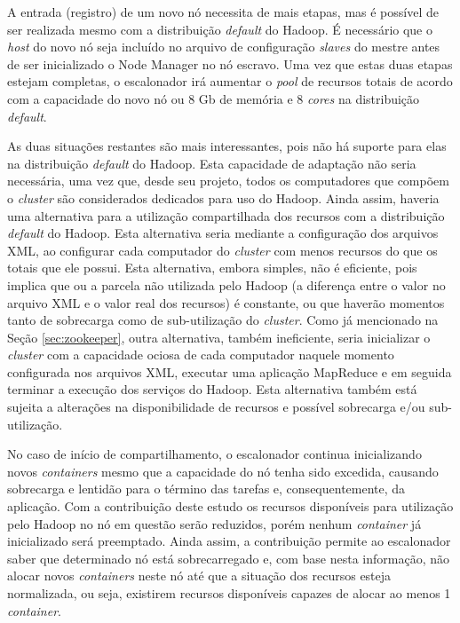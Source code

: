 A entrada (registro) de um novo nó necessita de mais etapas, mas é possível de ser realizada mesmo com a distribuição \textit{default} do Hadoop. É necessário que o \textit{host} do novo nó seja incluído no arquivo de configuração \textit{slaves} do mestre antes de ser inicializado o Node Manager no nó escravo. Uma vez que estas duas etapas estejam completas, o escalonador irá aumentar o \textit{pool} de recursos totais de acordo com a capacidade do novo nó ou 8 Gb de memória e 8 \textit{cores} na distribuição \textit{default}.

As duas situações restantes são mais interessantes, pois não há suporte para elas na distribuição \textit{default} do Hadoop. Esta capacidade de adaptação não seria necessária, uma vez que, desde seu projeto, todos os computadores que compõem o \textit{cluster} são considerados dedicados para uso do Hadoop. Ainda assim, haveria uma alternativa para a utilização compartilhada dos recursos com a distribuição \textit{default} do Hadoop. Esta alternativa seria mediante a configuração dos arquivos XML, ao configurar cada computador do \textit{cluster} com menos recursos do que os totais que ele possui. Esta alternativa, embora simples, não é eficiente, pois implica que ou a parcela não utilizada pelo Hadoop (a diferença entre o valor no arquivo XML e o valor real dos recursos) é constante, ou que haverão momentos tanto de sobrecarga como de sub-utilização do \textit{cluster}. Como já mencionado na Seção \ref{sec:zookeeper}, outra alternativa, também ineficiente, seria inicializar o \textit{cluster} com a capacidade ociosa de cada computador naquele momento configurada nos arquivos XML, executar uma aplicação MapReduce e em seguida terminar a execução dos serviços do Hadoop. Esta alternativa também está sujeita a alterações na disponibilidade de recursos e possível sobrecarga e/ou sub-utilização.

No caso de início de compartilhamento, o escalonador continua inicializando novos \textit{containers} mesmo que a capacidade do nó tenha sido excedida, causando sobrecarga e lentidão para o término das tarefas e, consequentemente, da aplicação. Com a contribuição deste estudo os recursos disponíveis para utilização pelo Hadoop no nó em questão serão reduzidos, porém nenhum \textit{container} já inicializado será preemptado. Ainda assim, a contribuição permite ao escalonador saber que determinado nó está sobrecarregado e, com base nesta informação, não alocar novos \textit{containers} neste nó até que a situação dos recursos esteja normalizada, ou seja, existirem recursos disponíveis capazes de alocar ao menos 1 \textit{container}.

